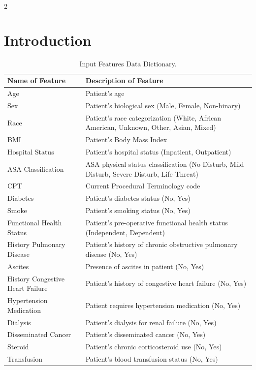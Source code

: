 \documentclass[bst/sn-nature]{sn-jnl}
\begin{document}
\begin{multicols}{2}

\section{Introduction}
\begin{table}[b]
\centering
\caption{Input Features Data Dictionary.}
\label{tab:input_feature_dict}
\begin{tabular}{ll}
\toprule
\textbf{Name of Feature} & \textbf{Description of Feature} \\
\midrule
\rowcolor{gray!10} Age & Patient's age \\
Sex & Patient's biological sex (Male, Female, Non-binary) \\
\rowcolor{gray!10} Race & Patient's race categorization (White, African American, Unknown, Other, Asian, Mixed) \\
BMI & Patient's Body Mass Index \\
\rowcolor{gray!10} Hospital Status & Patient's hospital status (Inpatient, Outpatient) \\
ASA Classification & ASA physical status classification (No Disturb, Mild Disturb, Severe Disturb, Life Threat) \\
\rowcolor{gray!10} CPT & Current Procedural Terminology code \\
Diabetes & Patient's diabetes status (No, Yes) \\
\rowcolor{gray!10} Smoke & Patient's smoking status (No, Yes) \\
Functional Health Status & Patient's pre-operative functional health status (Independent, Dependent) \\
\rowcolor{gray!10} History Pulmonary Disease & Patient's history of chronic obstructive pulmonary disease (No, Yes) \\
Ascites & Presence of ascites in patient (No, Yes) \\
\rowcolor{gray!10} History Congestive Heart Failure & Patient's history of congestive heart failure (No, Yes) \\
Hypertension Medication & Patient requires hypertension medication (No, Yes) \\
\rowcolor{gray!10} Dialysis & Patient's dialysis for renal failure (No, Yes) \\
Disseminated Cancer & Patient's disseminated cancer (No, Yes) \\
\rowcolor{gray!10} Steroid & Patient's chronic corticosteroid use (No, Yes) \\
Transfusion & Patient's blood transfusion status (No, Yes) \\
\bottomrule
\end{tabular}
\end{table}


\end{multicols}
\end{document}
